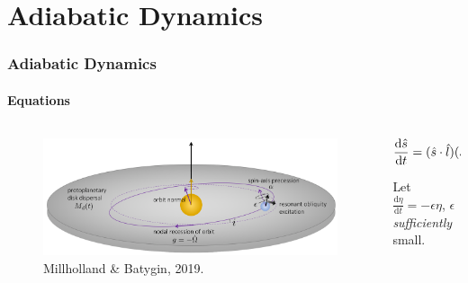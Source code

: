 \documentclass[dvipsnames]{beamer}
\newcommand*{\rd}[2]{\frac{\mathrm{d}#1}{\mathrm{d}#2}}
\DeclarePairedDelimiter\p{\lparen}{\rparen}
\begin{document}
\section{Adiabatic Dynamics}

\begin{frame}
    \frametitle{Adiabatic Dynamics}
    \framesubtitle{Equations}

    \begin{columns}
        \begin{column}{0.5\textwidth}
            \begin{figure}[t]
                \centering
                \includegraphics[width=\textwidth]{../GM_190913/1millholland_disk.png}
                \caption{Millholland \& Batygin, 2019.}
            \end{figure}
        \end{column}
        \begin{column}{0.5\textwidth}
            \begin{equation*}
                \rd{\hat{s}}{t}
                    = \p{\hat{s} \cdot \hat{l}}
                        \p{\hat{s} \times \hat{l}}
                    - \eta\p{\hat{s} \times \hat{l}_d}.
            \end{equation*}

            Let $\rd{\eta}{t} = -\epsilon \eta$, $\epsilon$ \emph{sufficiently}
            small.
        \end{column}
    \end{columns}
\end{frame}
\end{document}
